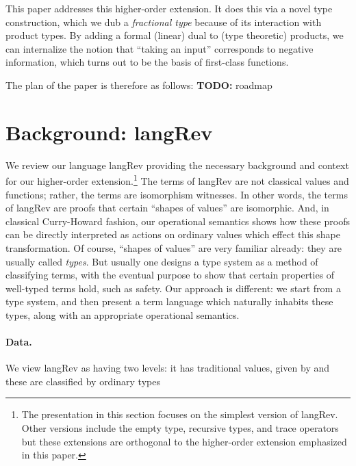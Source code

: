 \documentclass{llncs}
\newcommand{\todo}[1]{\textbf{TODO:} #1}
\begin{document}
This paper addresses this higher-order extension.  It does this via a novel
type construction, which we dub a \emph{fractional type} because of its
interaction with product types.  By adding a formal (linear) dual to
(type theoretic) products, we can internalize the notion that ``taking an
input'' corresponds to negative information, which turns out to be the 
basis of first-class functions.

The plan of the paper is therefore
as follows: \todo{roadmap}

\section{Background: {{langRev}} }

We review our language {{langRev}} providing the necessary background and
context for our higher-order extension.\footnote{The presentation in this
  section focuses on the simplest version of {{langRev}}. Other versions
  include the empty type, recursive types, and trace operators but these
  extensions are orthogonal to the higher-order extension emphasized in this
  paper.} The terms of {{langRev}} are not classical values and functions;
rather, the terms are isomorphism witnesses.  In other words, the terms of
{{langRev}} are proofs that certain ``shapes of values'' are isomorphic.
And, in classical Curry-Howard fashion, our operational semantics shows how
these proofs can be directly interpreted as actions on ordinary values which
effect this shape transformation. Of course, ``shapes of values'' are very
familiar already: they are usually called \emph{types}.  But usually one
designs a type system as a method of classifying terms, with the eventual
purpose to show that certain properties of well-typed terms hold, such as
safety.  Our approach is different: we start from a type system, and then
present a term language which naturally inhabits these types, along with an
appropriate operational semantics.

\paragraph*{Data.}
We view {{langRev}} as having two levels:  it has traditional values, given by
and these are classified by ordinary types
\end{document}
